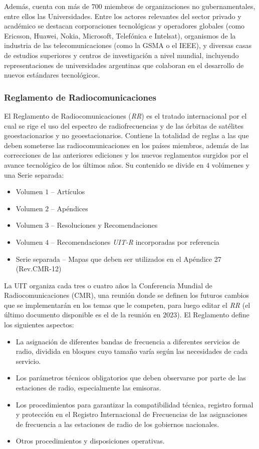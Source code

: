 \documentclass[12pt]{article}
\begin{document}
Además, cuenta con más de $700$ miembros de organizaciones no gubernamentales, entre ellos las Universidades. Entre los actores relevantes del sector privado y académico se destacan corporaciones tecnológicas y operadores globales (como Ericsson, Huawei, Nokia, Microsoft, Telefónica e Intelsat), organismos de la industria de las telecomunicaciones (como la GSMA o el IEEE), y diversas casas de estudios superiores y centros de investigación a nivel mundial, incluyendo representaciones de universidades argentinas que colaboran en el desarrollo de nuevos estándares tecnológicos. \cite{b4}

\subsubsection{Reglamento de Radiocomunicaciones}
\label{sec_2.1.4}
El Reglamento de Radiocomunicaciones (\textit{RR}) es el tratado internacional por el cual se rige el uso del espectro de radiofrecuencias y de las órbitas de satélites geoestacionarios y no geoestacionarios. Contiene la totalidad de reglas a las que deben someterse las radiocomunicaciones en los países miembros, además de las correcciones de las anteriores ediciones y los nuevos reglamentos surgidos por el avance tecnológico de los últimos años. Su contenido se divide en $4$ volúmenes y una Serie separada:
\begin{itemize}
    \item Volumen $1$ – Artículos
    \item Volumen $2$ – Apéndices
    \item Volumen $3$ – Resoluciones y Recomendaciones
    \item Volumen $4$ – Recomendaciones \textit{UIT-R} incorporadas por referencia
    \item Serie separada – Mapas que deben ser utilizados en el Apéndice 27 (Rev.CMR-12)
\end{itemize}

La UIT organiza cada tres o cuatro años la Conferencia Mundial de Radiocomunicaciones (CMR), una reunión donde se definen los futuros cambios que se implementarán en los temas que le competen, para luego editar el \textit{RR} (el último documento disponible es el de la reunión en $2023$). El Reglamento define los siguientes aspectos:
\begin{itemize}
    \item La asignación de diferentes bandas de frecuencia a diferentes servicios de radio, dividida en bloques cuyo tamaño varía según las necesidades de cada servicio.

    \item Los parámetros técnicos obligatorios que deben observarse por parte de las estaciones de radio, especialmente las emisoras.

    \item Los procedimientos para garantizar la compatibilidad técnica, registro formal y protección en el Registro Internacional de Frecuencias de las asignaciones de frecuencia a las estaciones de radio de los gobiernos nacionales.

    \item Otros procedimientos y disposiciones operativas.
\end{itemize}
\end{document}
